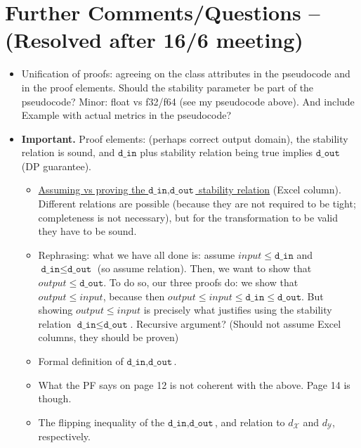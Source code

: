 \documentclass[11pt,a4paper]{article}
\theoremstyle{definition}
\newcommand{\din}{\texttt{d\_in}}
\newcommand{\dout}{\texttt{d\_out}}
\newcommand{\X}{\mathcal{X}}
\newcommand{\Y}{\mathcal{Y}}
\begin{document}

\section{Further Comments/Questions -- (Resolved after 16/6 meeting)}
\begin{itemize}
    \item Unification of proofs: agreeing on the class attributes in the pseudocode and in the proof elements. Should the stability parameter be part of the pseudocode? Minor: float vs f32/f64 (see my pseudocode above). And include Example with actual metrics in the pseudocode?
    \item \textbf{Important.} Proof elements: (perhaps correct output domain), the stability relation is sound, and $\din$ plus stability relation being true implies $\dout$ (DP guarantee). 
    \begin{itemize}
        \item \underline{Assuming vs proving the $\din, \dout$ stability relation} (Excel column). Different relations are possible (because they are not required to be tight; completeness is not necessary), but for the transformation to be valid they have to be sound. 
        \item Rephrasing: what we have all done is: assume $input \leq \din$ and $\din \leq \dout$ (so assume relation). Then, we want to show that $output \leq \dout$. To do so, our three proofs do: we show that $output \leq input$, because then $output \leq input \leq \din \leq \dout$. But showing $output \leq input$ is precisely what justifies using the stability relation $\din \leq \dout$. Recursive argument? (Should not assume Excel columns, they should be proven)
        \item Formal definition of $\din, \dout$.
        \item What the PF says on page 12 is not coherent with the above. Page 14 is though.
        \item The flipping inequality of the $\din, \dout$, and relation to $d_{\X}$ and $d_{\Y}$, respectively.

\end{itemize}
\end{itemize}
\end{document}
